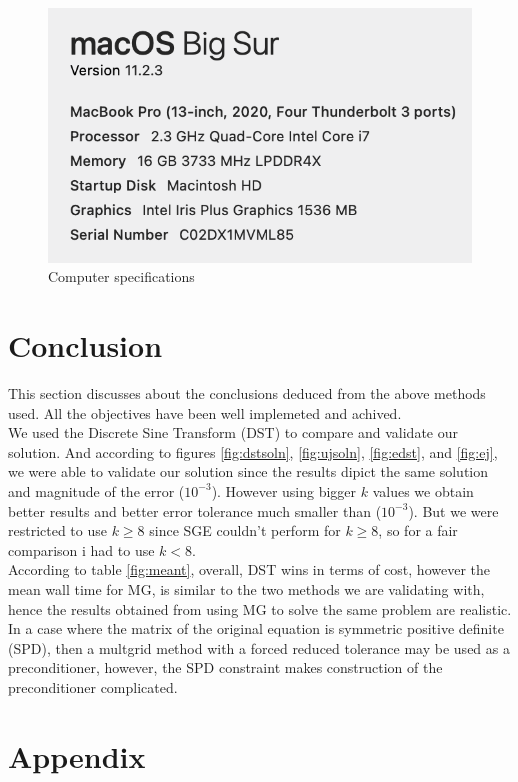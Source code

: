 \documentclass[12pt,a4paper]{article}
\begin{document}
\begin{figure}[H]
	\centering
	\includegraphics[width=0.5\linewidth]{"Screenshot 2021-03-19 at 12.49.12 PM"}
	\caption{Computer specifications}
	\label{fig:spec}
\end{figure}
	
	\section{Conclusion}
	This section discusses about the conclusions deduced from the above methods used. All the objectives have been well implemeted and achived.\\
	
		\noindent We used the Discrete Sine Transform (DST) to compare and validate our solution. And according to figures \ref{fig:dstsoln}, \ref{fig:ujsoln}, \ref{fig:edst}, and \ref{fig:ej}, we were able to validate our solution since the results dipict the same solution and magnitude of the error ($10^{-3}$). However using bigger $k$ values we obtain better results and better error tolerance much smaller than  ($10^{-3}$). But we were restricted to use $k\ge 8$ since SGE couldn't perform for $k\ge 8$, so for a fair comparison i had to use $k < 8$.  \\
	
	\noindent According to table \ref{fig:meant}, overall, DST wins in terms of cost, however the mean wall time for MG, is similar to the two methods we are validating with, hence the results obtained from using MG to solve the same problem are realistic.\\
	
	\noindent In a case where the matrix of the original equation is symmetric positive definite (SPD), then a multgrid method with a forced reduced tolerance may be used as a preconditioner, however, the SPD constraint makes construction of the preconditioner complicated.

	
	
	
	\section{Appendix}
	
\end{document}
